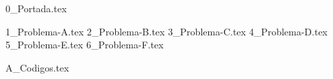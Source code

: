 \documentclass[a4paper,12pt,twoside]{all-in-one} %
\begin{document}

{0_Portada.tex}
{
  \hypersetup{hidelinks}
  \tableofcontents
}
\clearpage

{1_Problema-A.tex}
\clearpage
{2_Problema-B.tex}
\clearpage
{3_Problema-C.tex}
\clearpage
{4_Problema-D.tex}
\clearpage
{5_Problema-E.tex}
\clearpage
{6_Problema-F.tex}

\clearpage
\appendix
{A_Codigos.tex}

\clearpage
\pagestyle{\auxsettings}
\printbibliography[heading=bibintoc]
\end{document}
